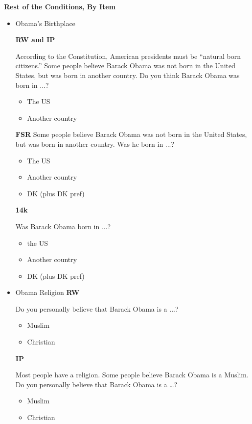 \textbf{Rest of the Conditions, By Item}

\begin{itemize}
\item Obama's Birthplace

\textbf{RW and IP}\newline

According to the Constitution, American presidents must be ``natural born citizens.''
Some people believe Barack Obama was not born in the United States, but was born
in another country. Do you think Barack Obama was born in ...?
\begin{itemize}
	\item The US
	\item Another country
\end{itemize}

\textbf{FSR}\newline
Some people believe Barack Obama was not born in the United States, but was born
in another country. Was he born in ...?
\begin{itemize}
	\item The US
	\item Another country
	\item DK (plus DK pref)
\end{itemize}

\textbf{14k}\newline

Was Barack Obama born in ...?
\begin{itemize}
	\item the US
	\item Another country
	\item DK (plus DK pref)
\end{itemize}

\item Obama Religion\newline
\textbf{RW}\newline

Do you personally believe that Barack Obama is a ...?
\begin{itemize}
	\item Muslim
	\item Christian
\end{itemize}

\textbf{IP}\newline

Most people have a religion. Some people believe Barack Obama is a Muslim. Do
you personally believe that Barack Obama is a \ldots?
\begin{itemize}
	\item Muslim
	\item Christian
\end{itemize}


\end{itemize}
